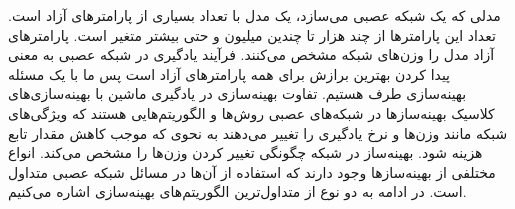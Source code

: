   مدلی که یک شبکه عصبی می‌سازد، یک مدل با تعداد بسیاری از پارامترهای آزاد است. تعداد این پارامترها از چند هزار تا چندین میلیون و حتی بیشتر متغیر است. پارامترهای آزاد مدل را وزن‌های شبکه مشخص می‌کنند. فرآیند یادگیری در شبکه عصبی به معنی پیدا کردن بهترین برازش برای همه پارامترهای آزاد است پس ما با یک مسئله بهینه‌سازی طرف هستیم. تفاوت بهینه‌سازی در یادگیری ماشین با بهینه‌سازی‌های کلاسیک  بهینه‌سازها در شبکه‌های عصبی روش‌ها و الگوریتم‌هایی هستند که ویژگی‌های شبکه مانند وزن‌ها و نرخ یادگیری را تغییر می‌دهند به نحوی که موجب کاهش مقدار تابع هزینه شود. بهینه‌ساز در شبکه چگونگی تغییر کردن وزن‌ها را مشخص می‌کند. انواع مختلفی از بهینه‌ساز‌ها وجود دارند که استفاده از آن‌ها در مسائل شبکه عصبی متداول است. در ادامه به دو نوع از متداول‌ترین الگوریتم‌های بهینه‌سازی اشاره می‌کنیم.
